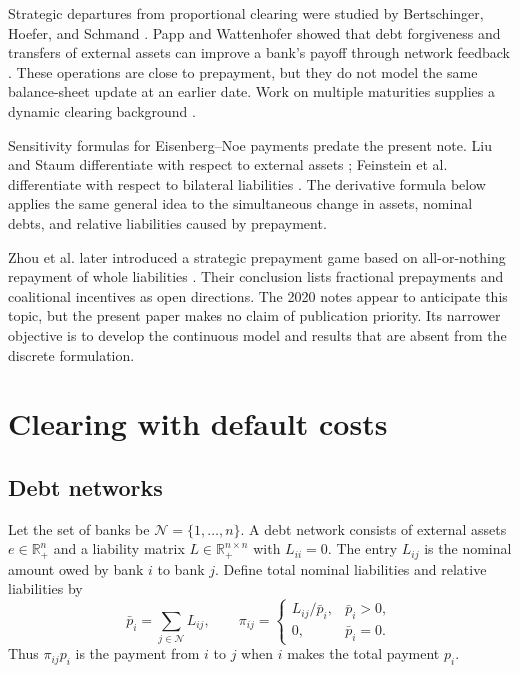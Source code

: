 \documentclass[11pt]{article}
\theoremstyle{definition}
\theoremstyle{remark}
\newcommand{\R}{\mathbb{R}}
\newcommand{\N}{\mathcal{N}}
\newcommand{\pbar}{\bar p}
\begin{document}
Strategic departures from proportional clearing were studied by Bertschinger,
Hoefer, and Schmand \cite{BertschingerEtAl2020}.  Papp and Wattenhofer showed
that debt forgiveness and transfers of external assets can improve a bank's
payoff through network feedback \cite{PappWattenhofer2020}.  These operations
are close to prepayment, but they do not model the same balance-sheet update at
an earlier date.  Work on multiple maturities supplies a dynamic clearing
background \cite{KusnetsovVeraart2019}.

Sensitivity formulas for Eisenberg--Noe payments predate the present note.
Liu and Staum differentiate with respect to external assets
\cite{LiuStaum2010}; Feinstein et al. differentiate with respect to bilateral
liabilities \cite{FeinsteinEtAl2018}.  The derivative formula below applies
the same general idea to the simultaneous change in assets, nominal debts, and
relative liabilities caused by prepayment.

Zhou et al. later introduced a strategic prepayment game based on
all-or-nothing repayment of whole liabilities \cite{ZhouEtAl2024}.  Their
conclusion lists fractional prepayments and coalitional incentives as open
directions.  The 2020 notes appear to anticipate this topic, but the present
paper makes no claim of publication priority.  Its narrower objective is to
develop the continuous model and results that are absent from the discrete
formulation.

\section{Clearing with default costs}

\subsection{Debt networks}

Let the set of banks be $\N=\{1,\ldots,n\}$.  A debt network consists of
external assets $e\in\R_+^n$ and a liability matrix
$L\in\R_+^{n\times n}$ with $L_{ii}=0$.  The entry $L_{ij}$ is the nominal
amount owed by bank $i$ to bank $j$.  Define total nominal liabilities and
relative liabilities by
\begin{equation}
  \pbar_i=\sum_{j\in\N}L_{ij},
  \qquad
  \pi_{ij}=
  \begin{cases}
    L_{ij}/\pbar_i, & \pbar_i>0,\\
    0, & \pbar_i=0.
  \end{cases}
\end{equation}
Thus $\pi_{ij}p_i$ is the payment from $i$ to $j$ when $i$ makes the
total payment $p_i$.
\end{document}
